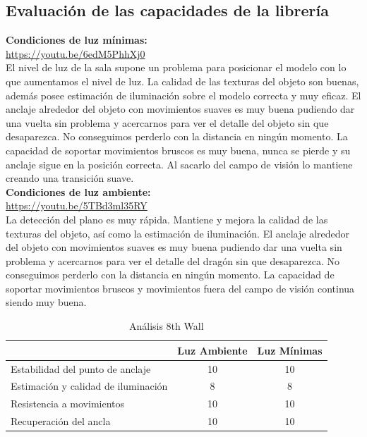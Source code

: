 \subsection{Evaluación de las capacidades de la librería}
\textbf{Condiciones de luz mínimas:}\\
\url{https://youtu.be/6edM5PhhXj0}\\

El nivel de luz de la sala supone un problema para posicionar el modelo con lo que aumentamos el nivel de luz. La calidad de las texturas del objeto son buenas, además posee estimación de iluminación sobre el modelo correcta y muy eficaz. El anclaje alrededor del objeto con movimientos suaves es muy buena pudiendo dar una vuelta sin problema y acercarnos para ver el detalle del objeto sin que desaparezca. No conseguimos perderlo con la distancia en ningún momento. La capacidad de soportar movimientos bruscos es muy buena, nunca se pierde y su anclaje sigue en la posición correcta. Al sacarlo del campo de visión lo mantiene creando una transición suave.\\

\textbf{Condiciones de luz ambiente:}\\
\url{https://youtu.be/5TBd3ml35RY}\\

La detección del plano es muy rápida. Mantiene y mejora la calidad de las texturas del objeto, así como la estimación de iluminación. El anclaje alrededor del objeto con movimientos suaves es muy buena pudiendo dar una vuelta sin problema y acercarnos para ver el detalle del dragón sin que desaparezca. No conseguimos perderlo con la distancia en ningún momento. La capacidad de soportar movimientos bruscos y movimientos fuera del campo de visión continua siendo muy buena.

\begin{table}[H]
    \centering
      \begin{tabular}{l c c}
    \toprule
          & Luz Ambiente & Luz Mínimas \\
         \midrule
        Estabilidad del punto de anclaje   &10 &10\\
        
        Estimación y calidad de iluminación  &8 &8 \\
        
        Resistencia a movimientos  &10 &10 \\
        
        Recuperación del ancla  &10 &10 \\
      \bottomrule
    \end{tabular}
    \caption{Análisis 8th Wall}
    \label{tab:T8thWall}
\end{table}
